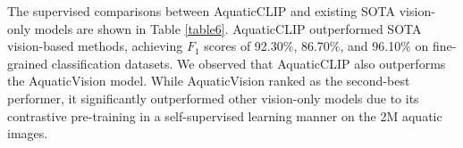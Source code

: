 The supervised comparisons between AquaticCLIP and existing SOTA vision-only models are shown in Table \ref{table6}. 
AquaticCLIP outperformed SOTA vision-based methods, achieving $F_{1}$ scores of 92.30$\%$, 86.70$\%$, and 96.10$\%$ on fine-grained classification datasets. 
We observed that AquaticCLIP also outperforms the AquaticVision model. 
While AquaticVision ranked as the second-best performer, it significantly outperformed other vision-only models due to its contrastive pre-training in a self-supervised learning manner on the 2M aquatic images.




